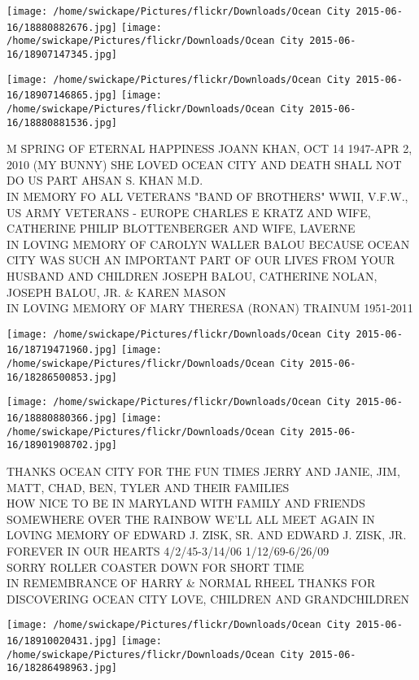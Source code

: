 \documentclass[10pt,letterpaper]{article}
\begin{document}
\texttt{[image: /home/swickape/Pictures/flickr/Downloads/Ocean City 2015-06-16/18880882676.jpg]}
\texttt{[image: /home/swickape/Pictures/flickr/Downloads/Ocean City 2015-06-16/18907147345.jpg]}

\texttt{[image: /home/swickape/Pictures/flickr/Downloads/Ocean City 2015-06-16/18907146865.jpg]}
\texttt{[image: /home/swickape/Pictures/flickr/Downloads/Ocean City 2015-06-16/18880881536.jpg]}

M SPRING OF ETERNAL HAPPINESS JOANN KHAN, OCT 14 1947{-}APR 2, 2010 (MY BUNNY) SHE LOVED OCEAN CITY AND DEATH SHALL NOT DO US PART AHSAN S. KHAN M.D.\\
IN MEMORY FO ALL VETERANS "BAND OF BROTHERS" WWII, V.F.W., US ARMY VETERANS {-} EUROPE CHARLES E KRATZ AND WIFE, CATHERINE PHILIP BLOTTENBERGER AND WIFE, LAVERNE\\
IN LOVING MEMORY OF CAROLYN WALLER BALOU BECAUSE OCEAN CITY WAS SUCH AN IMPORTANT PART OF OUR LIVES FROM YOUR HUSBAND AND CHILDREN JOSEPH BALOU, CATHERINE NOLAN, JOSEPH BALOU, JR. \& KAREN MASON\\
IN LOVING MEMORY OF MARY THERESA (RONAN) TRAINUM 1951{-}2011
\pagebreak

\texttt{[image: /home/swickape/Pictures/flickr/Downloads/Ocean City 2015-06-16/18719471960.jpg]}
\texttt{[image: /home/swickape/Pictures/flickr/Downloads/Ocean City 2015-06-16/18286500853.jpg]}

\texttt{[image: /home/swickape/Pictures/flickr/Downloads/Ocean City 2015-06-16/18880880366.jpg]}
\texttt{[image: /home/swickape/Pictures/flickr/Downloads/Ocean City 2015-06-16/18901908702.jpg]}

THANKS OCEAN CITY FOR THE FUN TIMES JERRY AND JANIE, JIM, MATT, CHAD, BEN, TYLER AND THEIR FAMILIES\\
HOW NICE TO BE IN MARYLAND WITH FAMILY AND FRIENDS SOMEWHERE OVER THE RAINBOW WE'LL ALL MEET AGAIN IN LOVING MEMORY OF EDWARD J. ZISK, SR. AND EDWARD J. ZISK, JR. FOREVER IN OUR HEARTS 4/2/45{-}3/14/06 1/12/69{-}6/26/09\\
SORRY ROLLER COASTER DOWN FOR SHORT TIME\\
IN REMEMBRANCE OF HARRY \& NORMAL RHEEL THANKS FOR DISCOVERING OCEAN CITY LOVE, CHILDREN AND GRANDCHILDREN
\pagebreak

\texttt{[image: /home/swickape/Pictures/flickr/Downloads/Ocean City 2015-06-16/18910020431.jpg]}
\texttt{[image: /home/swickape/Pictures/flickr/Downloads/Ocean City 2015-06-16/18286498963.jpg]}
\end{document}
